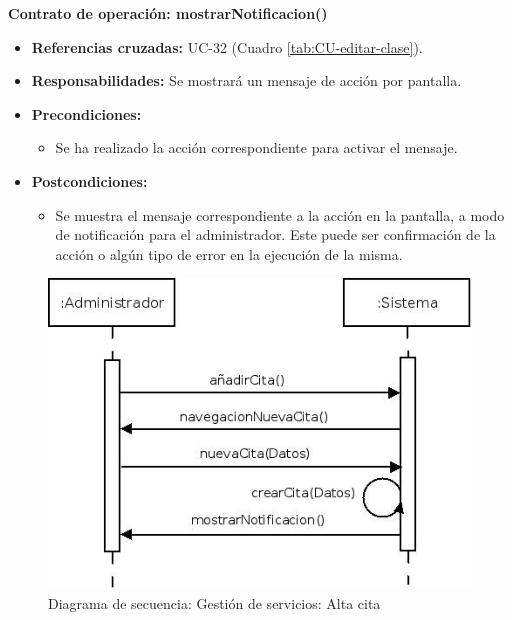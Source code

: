 \textbf{Contrato de operación: mostrarNotificacion()}
\begin{itemize}
\item \textbf{Referencias cruzadas:} UC-32 (Cuadro \ref{tab:CU-editar-clase}).
\item \textbf{Responsabilidades:} Se mostrará un mensaje de acción por pantalla.
\item \textbf{Precondiciones:} 
 \begin{itemize}
\item Se ha realizado la acción correspondiente para activar el mensaje.
\end {itemize}
\item \textbf{Postcondiciones:} 
 \begin{itemize}
\item Se muestra el mensaje correspondiente a la acción en la pantalla, a modo de notificación para el administrador. Este puede ser confirmación de la acción o algún tipo de error en la ejecución de la misma.
\end {itemize}
\end {itemize}


\vspace{10mm}

\begin{figure}[H]
\centering
  \includegraphics[scale=.55]{img/secuencias/gestion-servicios-alta-cita.jpeg}
  \caption{Diagrama de secuencia: Gestión de servicios: Alta cita}
  \label{fig:secuencia-gestion-servicios-alta-cita}
\end{figure}

